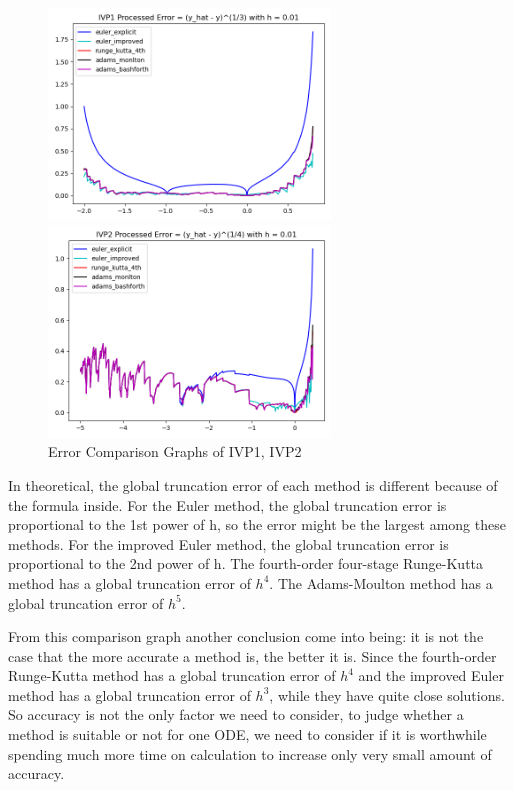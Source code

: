 \documentclass[a4paper]{article}
\begin{document}
    \begin{figure}[H]
    \subfigure 
    {
    	\begin{minipage}{8cm}
    	 \centering      
    		\includegraphics[width=7.5cm]{img/ivp1_error.png}
    		\caption{\label{fig:ivp1_error} }
    	\end{minipage}
    }
    \subfigure 
    {
    	\begin{minipage}{8cm}
    	\centering      
    		\includegraphics[width=7.5cm]{img/ivp2_error.png}
    		\caption{\label{fig:ivp2_error}}
    	\end{minipage}
    }
    \caption{Error Comparison Graphs of IVP1, IVP2} 
    \end{figure}
   
   In theoretical, the global truncation error of each method is different because of the formula inside. For the Euler method, the global truncation error is proportional to the 1st power of h, so the error might be the largest among these methods. For the improved Euler method, the global truncation error is proportional to the 2nd power of h. The fourth-order four-stage Runge-Kutta method has a global truncation error of $h^4$. The Adams-Moulton method has a global truncation error of $h^5$.
   
   From this comparison graph another conclusion come into being: it is not the case that the more accurate a method is, the better it is. Since the fourth-order Runge-Kutta method has a global truncation error of $h^4$ and the improved Euler method has a global truncation error of $h^3$, while they have quite close solutions. So accuracy is not the only factor we need to consider, to judge whether a method is suitable or not for one ODE, we need to consider if it is worthwhile spending much more time on calculation to increase only very small amount of accuracy. 
   
\end{document}
